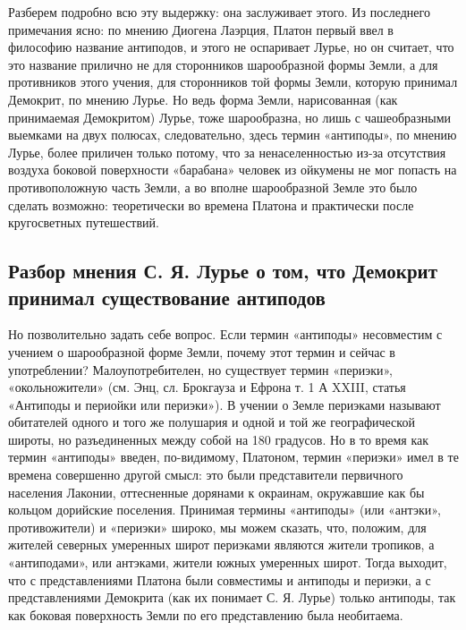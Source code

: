 Разберем  подробно  всю  эту   выдержку:  она  заслуживает  этого.  Из
последнего примечания  ясно: по мнению Диогена  Лаэрция, Платон первый
ввел в философию  название антиподов, и этого не  оспаривает Лурье, но
он считает, что это название  прилично не для сторонников шарообразной
формы  Земли, а  для  противников этого  учения,  для сторонников  той
формы  Земли, которую  принимал  Демокрит, по  мнению  Лурье. Но  ведь
форма  Земли, нарисованная  (как принимаемая  Демокритом) Лурье,  тоже
шарообразна,  но  лишь  с  чашеобразными  выемками  на  двух  полюсах,
следовательно,  здесь  термин  «антиподы»,   по  мнению  Лурье,  более
приличен  только  потому,  что  за  ненаселенностью  из-за  отсутствия
воздуха  боковой поверхности  «барабана»  человек из  ойкумены не  мог
попасть  на  противоположную часть  Земли,  а  во вполне  шарообразной
Земле это  было сделать  возможно: теоретически  во времена  Платона и
практически после кругосветных путешествий.

\subsection{Разбор мнения  С. Я.  Лурье о  том, что  Демокрит принимал
существование антиподов}

Но   позволительно  задать   себе  вопрос.   Если  термин   «антиподы»
несовместим с учением  о шарообразной форме Земли,  почему этот термин
и  сейчас  в  употреблении? Малоупотребителен,  но  существует  термин
«периэки»,  «окольножители» (см.  Энц,  сл. Брокгауза  и  Ефрона т.  1
А  XXIII,  статья «Антиподы  и  периойки  или  периэки»). В  учении  о
Земле  периэками называют  обитателей  одного и  того  же полушария  и
одной и  той же  географической широты,  но разъединенных  между собой
на  180  градусов.  Но  в  то  время  как  термин  «антиподы»  введен,
по-видимому, Платоном,  термин «периэки» имел в  те времена совершенно
другой  смысл: это  были представители  первичного населения  Лаконии,
оттесненные дорянами  к окраинам, окружавшие как  бы кольцом дорийские
поселения. Принимая термины «антиподы» (или «антэки», противожители) и
«периэки» широко, мы можем сказать, что, положим, для жителей северных
умеренных широт  периэками являются  жители тропиков,  а «антиподами»,
или  антэками, жители  южных  умеренных широт.  Тогда  выходит, что  с
представлениями  Платона были  совместимы и  антиподы и  периэки, а  с
представлениями  Демокрита  (как  их  понимает  С.  Я.  Лурье)  только
антиподы, так как боковая поверхность  Земли по его представлению была
необитаема.

